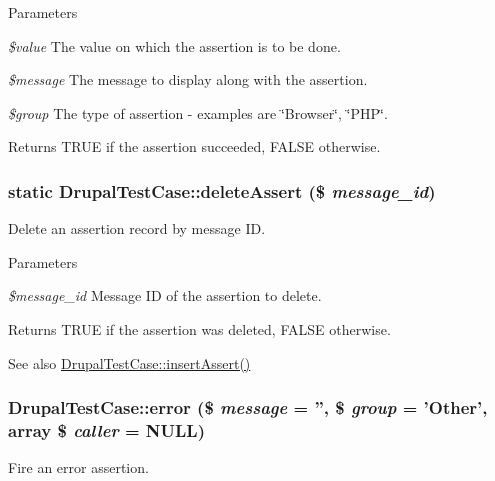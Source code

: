 \begin{DoxyParams}{Parameters}
\item[{\em \$value}]The value on which the assertion is to be done. \item[{\em \$message}]The message to display along with the assertion. \item[{\em \$group}]The type of assertion -\/ examples are \char`\"{}Browser\char`\"{}, \char`\"{}PHP\char`\"{}. \end{DoxyParams}
\begin{DoxyReturn}{Returns}
TRUE if the assertion succeeded, FALSE otherwise. 
\end{DoxyReturn}
\hypertarget{classDrupalTestCase_a1a5ada7d27370a7788be5b97d280ebab}{
\subsubsection[{deleteAssert}]{\setlength{\rightskip}{0pt plus 5cm}static DrupalTestCase::deleteAssert (\$ {\em message\_\-id})}}
\label{classDrupalTestCase_a1a5ada7d27370a7788be5b97d280ebab}
Delete an assertion record by message ID.


\begin{DoxyParams}{Parameters}
\item[{\em \$message\_\-id}]Message ID of the assertion to delete. \end{DoxyParams}
\begin{DoxyReturn}{Returns}
TRUE if the assertion was deleted, FALSE otherwise.
\end{DoxyReturn}
\begin{DoxySeeAlso}{See also}
\hyperlink{classDrupalTestCase_add756d567d09f64668d57eb02be5b9fe}{DrupalTestCase::insertAssert()} 
\end{DoxySeeAlso}
\hypertarget{classDrupalTestCase_a4155c3ed4cbf233c259301427dee59fb}{
\subsubsection[{error}]{\setlength{\rightskip}{0pt plus 5cm}DrupalTestCase::error (\$ {\em message} = {\ttfamily ''}, \/  \$ {\em group} = {\ttfamily 'Other'}, \/  array \$ {\em caller} = {\ttfamily NULL})}}
\label{classDrupalTestCase_a4155c3ed4cbf233c259301427dee59fb}
Fire an error assertion.



